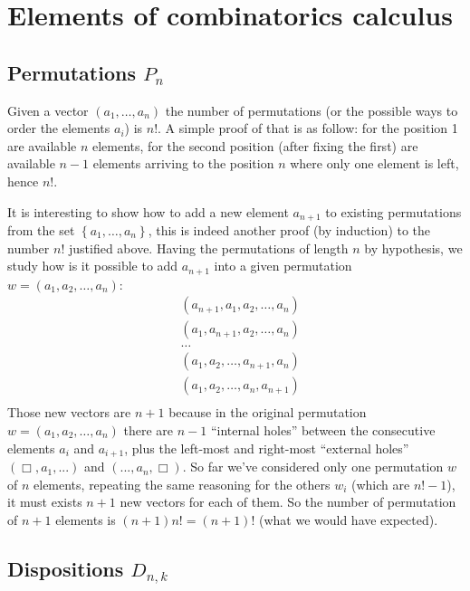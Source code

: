 
\section{Elements of combinatorics calculus}

\subsection{Permutations $P_n$}

Given a vector $\left ( a_1, \ldots, a_n \right) $ the number of
permutations (or the possible ways to order the elements $a_i$) is
$n!$. A simple proof of that is as follow: for the position 1 are
available $n$ elements, for the second position (after fixing the
first) are available $n-1$ elements arriving to the position $n$ where
only one element is left, hence $n!$.

It is interesting to show how to add a new element $a_{n+1}$ to
existing permutations from the set $\left \lbrace a_1, \ldots,
  a_n\right\rbrace $, this is indeed another proof (by induction) to
the number $n!$ justified above. Having the permutations of length $n$
by hypothesis, we study how is it possible to add $a_{n+1}$ into a
given permutation $w = \left ( a_1, a_2, \ldots, a_n\right) $:
\begin{displaymath}
  \begin{split}
    &\left ( a_{n+1}, a_1, a_2, \ldots, a_n\right)\\
    &\left ( a_1, a_{n+1}, a_2, \ldots, a_n\right)\\
    &\ldots\\
    &\left ( a_1, a_2, \ldots, a_{n+1}, a_n\right)\\
    &\left ( a_1, a_2, \ldots, a_n, a_{n+1}\right)\\
  \end{split}
\end{displaymath}
Those new vectors are $n+1$ because in the original permutation $w =
\left ( a_1, a_2, \ldots, a_n\right) $ there are $n-1$ ``internal
holes'' between the consecutive elements $a_i$ and $a_{i+1}$, plus the
left-most and right-most ``external holes'' $(\Box, a_1,...)$ and
$(..., a_n, \Box)$. So far we've considered only one permutation $w$
of $n$ elements, repeating the same reasoning for the others $w_i$
(which are $n!-1$), it must exists $n+1$ new vectors for each of
them. So the number of permutation of $n+1$ elements is $(n+1)n! =
(n+1)!$ (what we would have expected).

\subsection{Dispositions $D_{n,k}$}


